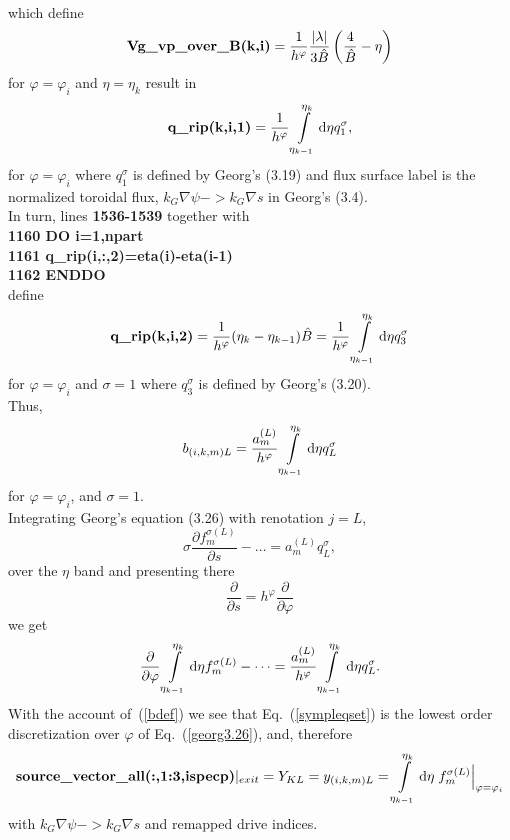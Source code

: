 \documentclass[preprint,prb,aps]{revtex4-1}
\newcommand{\be}[1]{\begin{equation} \label{#1}}
\newcommand{\ee}{\end{equation}}
\newcommand{\eq}[1]{(\ref{#1})}
\newcommand{\difp}[2]{\frac{\partial #1}{\partial #2}}
\newcommand{\rd}{{\rm d}}
\begin{document}
\\
which define
$$
\mbox{{\bf Vg\_vp\_over\_B(k,i)}}= \frac{1}{h^\varphi}
\frac{|\lambda|}{3\hat B}\left(\frac{4}{\hat B}-\eta\right)
$$
for $\varphi=\varphi_i$ and $\eta=\eta_k$ result in
\\
$$
\mbox{{\bf q\_rip(k,i,1)}}=\frac{1}{h^\varphi}\int\limits_{\eta_{k-1}}^{\eta_k}\rd \eta q_1^\sigma,
$$
for $\varphi=\varphi_i$ where $q_1^\sigma$ is defined by Georg's (3.19) and
flux surface label is the normalized toroidal flux, $k_G \nabla\psi -> k_G \nabla s$ in Georg's (3.4).
\\
In turn, lines {\bf 1536-1539} together with \\
{\bf
1160   DO i=1,npart \\
1161     q\_rip(i,:,2)=eta(i)-eta(i-1) \\
1162   ENDDO
}
\\
define \\
$$
\mbox{{\bf q\_rip(k,i,2)}}=\frac{1}{h^\varphi}(\eta_k-\eta_{k-1})\hat B=\frac{1}{h^\varphi}
\int\limits_{\eta_{k-1}}^{\eta_k}\rd \eta q_3^\sigma
$$
for $\varphi=\varphi_i$ and $\sigma=1$ where $q_3^\sigma$ is defined by Georg's (3.20).
\\
Thus,
\be{bdef}
b_{(i,k,m)L}=\frac{a_m^{(L)}}{h^\varphi} \int\limits_{\eta_{k-1}}^{\eta_k}\rd \eta q_L^\sigma
\ee
for $\varphi=\varphi_i$, and $\sigma=1$.
\\
Integrating Georg's equation (3.26) with renotation $j=L$,
$$
\sigma \difp{f^{\sigma(L)}_m}{s} - \dots = a_m^{(L)} q_L^\sigma,
$$
over the $\eta$ band and presenting there
$$
\difp{}{s}=h^\varphi\difp{}{\varphi}
$$
we get
\be{georg3.26}
\difp{}{\varphi} \int\limits_{\eta_{k-1}}^{\eta_k}\rd \eta f^{\sigma(L)}_m - \dots =
\frac{a_m^{(L)}}{h^\varphi} \int\limits_{\eta_{k-1}}^{\eta_k}\rd \eta q_L^\sigma.
\ee
With the account of~\eq{bdef} we see that Eq.~\eq{sympleqset} is the lowest order discretization
over $\varphi$ of Eq.~\eq{georg3.26}, and, therefore
\be{soldef}
\mbox{\bf source\_vector\_all(:,1:3,ispecp)}|_{exit}=Y_{KL}
=y_{(i,k,m)L}= \int\limits_{\eta_{k-1}}^{\eta_k}\rd \eta \left .f^{\sigma(L)}_m\right|_{\varphi=\varphi_i}
\ee
with $k_G \nabla\psi -> k_G \nabla s$ and remapped drive indices.
\end{document}
